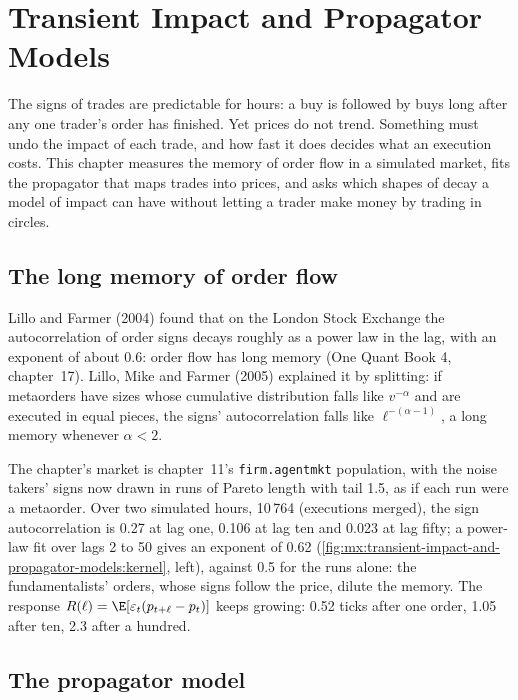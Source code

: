 \chapter{Transient Impact and Propagator Models}\label{ch:mx:transient-impact-and-propagator-models}

The signs of trades are predictable for hours: a buy is followed by buys long after any one trader's order has finished. Yet prices do not trend.
Something must undo the impact of each trade, and how fast it does decides what an execution costs. This chapter measures the memory of order flow in a
simulated market, fits the propagator that maps trades into prices, and asks which shapes of decay a model of impact can have without letting a trader
make money by trading in circles.

\section{The long memory of order flow}

Lillo and Farmer (2004) found that on the London Stock Exchange the autocorrelation of order signs decays roughly as a power law in the lag, with an
exponent of about 0.6: order flow has long memory (One Quant Book 4, chapter~17). Lillo, Mike and Farmer (2005) explained it by splitting: if metaorders
have sizes whose cumulative distribution falls like $v^{-\alpha}$ and are executed in equal pieces, the signs' autocorrelation falls like
$\ell^{-(\alpha-1)}$, a long memory whenever $\alpha<2$.

The chapter's market is chapter~11's \texttt{firm.agentmkt} population, with the noise takers' signs now drawn in runs of Pareto length with tail 1.5, as
if each run were a metaorder. Over two simulated hours, 10\,764  (executions merged), the sign autocorrelation is 0.27 at lag one, 0.106 at
lag ten and 0.023 at lag fifty; a power-law fit over lags 2 to 50 gives an exponent of 0.62 (\cref{fig:mx:transient-impact-and-propagator-models:kernel},
left), against 0.5 for the runs alone: the fundamentalists' orders, whose signs follow the price, dilute the memory. The response
$R(\ell)=\E[\varepsilon_t(p_{t+\ell}-p_t)]$ keeps growing: 0.52 ticks after one order, 1.05 after ten, 2.3 after a hundred.

\section{The propagator model}

